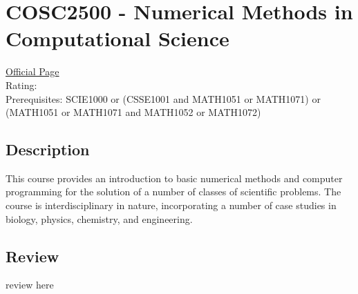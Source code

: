 \hypertarget{COSC2500}{\section{COSC2500 - Numerical Methods in Computational Science}}

\large
\textcolor{turbo_purple}{\href{https://my.uq.edu.au/programs-courses/course.html?course_code=COSC2500}{Official Page}} \\
Rating: \cstar\cstar\cstar\cstar\ostar \\
Prerequisites: SCIE1000 or (CSSE1001 and MATH1051 or MATH1071) or (MATH1051 or MATH1071 and MATH1052 or MATH1072)

\normalsize
\subsection*{Description}
This course provides an introduction to basic numerical methods and computer programming for the solution of a number of classes of scientific problems.
The course is interdisciplinary in nature, incorporating a number of case studies in biology, physics, chemistry, and engineering.

\subsection*{Review}
review here

